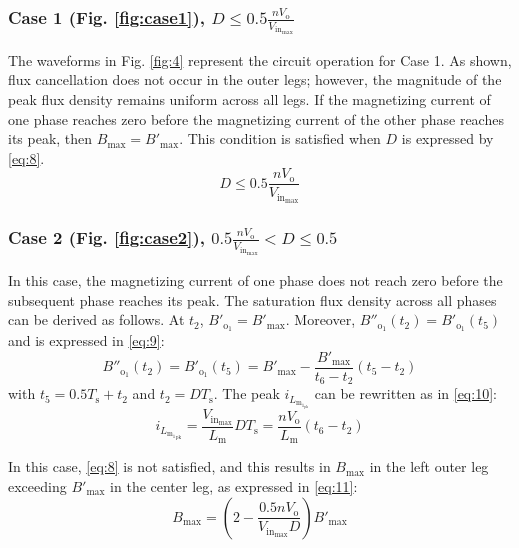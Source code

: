 \documentclass[lettersize,journal]{IEEEtran}
\begin{document}
\subsubsection*{\textup{Case 1 (Fig. \ref{fig:case1}),  $D \le 0.5 \frac{n V_{\mathrm{o}}}{V_{\mathrm{in}_{\mathrm{max}}}}$}}
The waveforms in Fig. \ref{fig:4} represent the circuit operation for Case 1. As shown, flux cancellation does not occur in the outer legs; however, the magnitude of the peak flux density remains uniform across all legs. If the magnetizing current of one phase reaches zero before the magnetizing current of the other phase reaches its peak, then $B_{\mathrm{max}} =  B'_{\mathrm{max}}$. This condition is satisfied when $D$ is expressed by \eqref{eq:8}.
\begin{equation}
\label{eq:8}
D \le 0.5 \frac{n V_{\mathrm{o}}}{V_{\mathrm{in}_{\mathrm{max}}}}
\end{equation}

\subsubsection*{\textup{Case 2 (Fig. \ref{fig:case2}), $0.5 \frac{n V_{\mathrm{o}}}{V_{\mathrm{in}_{\mathrm{max}}}} < D \le 0.5$}}
In this case, the magnetizing current of one phase does not reach zero before the subsequent phase reaches its peak. The saturation flux density across all phases can be derived as follows. At $t_2$, $B'_{\mathrm{o}_1} = B'_{\mathrm{max}}$. Moreover, $B''_{\mathrm{o}_1}(t_2) = B'_{\mathrm{o}_1}(t_5)$ and is expressed in \eqref{eq:9}:
\begin{equation}
\label{eq:9}
B''_{\mathrm{o}_1}(t_2) = B'_{\mathrm{o}_1}(t_5) = B'_{\mathrm{max}} - \frac{B'_{\mathrm{max}}}{t_6 - t_2}(t_5 - t_2)
\end{equation}
with $t_5 = 0.5 T_{\mathrm{s}} + t_2$ and $t_2 = D T_{\mathrm{s}}$. The peak $i_{L_{\mathrm{m}_{1_{\mathrm{pk}}}}}$ can be rewritten as in \eqref{eq:10}:
\begin{equation}
\label{eq:10}
i_{L_{{{\mathrm{m}_1}_{\mathrm{pk}}}}} = \frac{V_{\mathrm{in}_{\mathrm{max}}}}{L_{\mathrm{m}}} D T_{\mathrm{s}} = \frac{n V_{\mathrm{o}}}{L_{\mathrm{m}}}(t_6 - t_2)
\end{equation}

In this case, \eqref{eq:8} is not satisfied, and this results in $B_{\mathrm{max}}$ in the left outer leg exceeding $B'_{\mathrm{max}}$ in the center leg, as expressed in \eqref{eq:11}:
\begin{equation}
\label{eq:11}
B_{\mathrm{max}} = \left(2 - \frac{0.5 n V_{\mathrm{o}}}{V_{\mathrm{in}_{\mathrm{max}}} D}\right) B'_{\mathrm{max}}
\end{equation}
\end{document}
